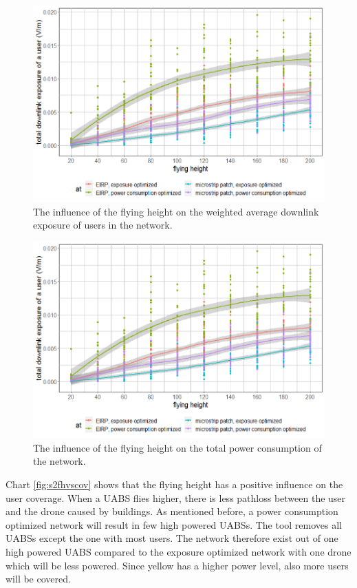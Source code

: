 \begin{figure}[h!]
  \includegraphics[width=\textwidth]{../results/s2/fhvsdl.png}
  \caption{The influence of the flying height on the weighted average downlink exposure of users in the network.}
  \label{fig:s2fhvsdl}
\end{figure}

\begin{figure}[h!]
  \includegraphics[width=\textwidth]{../results/s2/fhvsdl.png}
  \caption{The influence of the flying height on the total power consumption of the network.}
  \label{fig:s2fhvspc}
\end{figure}


Chart  \ref{fig:s2fhvscov} shows that the flying height has a positive influence on the user coverage. 
When a \gls{UABS} flies higher, there is less pathloss between the user and the drone caused by buildings. 
As mentioned before, a power consumption optimized network will result in few high powered \gls{UABS}s. 
The tool removes all \gls{UABS}s except the one with most users. 
The network therefore exist out of one high powered \gls{UABS} compared to the exposure optimized network with one drone which 
will be less powered. Since yellow has a higher power level, also more users will be covered.

